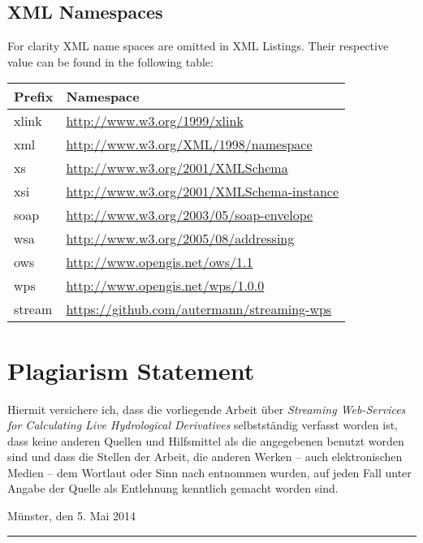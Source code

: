 \documentclass[paper=a4,
               fontsize=11pt,
               bibliography=totoc,
               listof=nochaptergap,
               listof=notoc,
               numbers=noendperiod,
               parskip=half,
               footnotes=multiple,
               toc=numberline,
               captions=tableheading,
               DIV=10,
              ]{scrreprt}
\begin{document}
\begin{appendix}
    \chapter{XML Namespaces}\label{sec:xmlnamespaces}
      For clarity XML name spaces are omitted in XML Listings. Their respective value can be found in the following table:
      \begin{center}
        \begin{small}
          \begin{tabular}{@{}ll@{}}
            \toprule
            \textbf{Prefix} & \textbf{Namespace} \\
            \midrule
            xlink  & \url{http://www.w3.org/1999/xlink}\\
            xml    & \url{http://www.w3.org/XML/1998/namespace}\\
            xs     & \url{http://www.w3.org/2001/XMLSchema}\\
            xsi    & \url{http://www.w3.org/2001/XMLSchema-instance}\\
            soap   & \url{http://www.w3.org/2003/05/soap-envelope}\\
            wsa    & \url{http://www.w3.org/2005/08/addressing}\\
            ows    & \url{http://www.opengis.net/ows/1.1}\\
            wps    & \url{http://www.opengis.net/wps/1.0.0}\\
            stream & \url{https://github.com/autermann/streaming-wps} \\
            \bottomrule
          \end{tabular}
        \end{small}
      \end{center}
  \end{appendix}

  \chapter*{Plagiarism Statement}
  Hiermit versichere ich, dass die vorliegende Arbeit über \emph{Streaming Web-Services for Calculating Live Hydrological Derivatives} selbstständig verfasst worden ist, dass keine anderen Quellen und Hilfsmittel als die angegebenen benutzt worden sind und dass die Stellen der Arbeit, die anderen Werken – auch elektronischen Medien – dem Wortlaut oder Sinn nach entnommen wurden, auf jeden Fall unter Angabe der Quelle als Entlehnung kenntlich gemacht worden sind.
  \begin{flushright}
    Münster, den 5. Mai 2014\hspace{.6cm}\rule{6cm}{.5pt}
  \end{flushright}
  \vspace{1cm}
\end{document}
